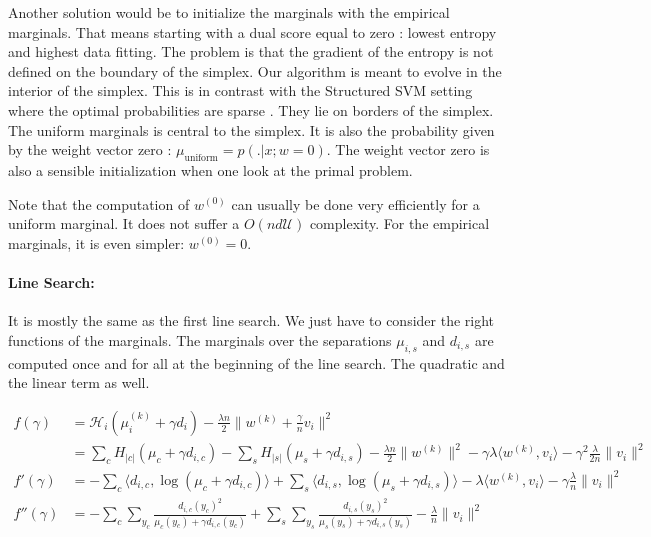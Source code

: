 \documentclass{article}
\DeclareMathOperator{\1}{\mathbb{1}}
\begin{document}
Another solution would be to initialize the marginals with the empirical marginals.
That means starting with a dual score equal to zero : lowest entropy and highest data fitting.
The problem is that the gradient of the entropy is not defined on the boundary of the simplex.
Our algorithm is meant to evolve in the interior of the simplex. 
This is in contrast with the Structured SVM setting where the optimal probabilities are sparse \cite{lacoste-julien_block-coordinate_2012}.
They lie on borders of the simplex.
The uniform marginals is central to the simplex.
It is also the probability given by the weight vector zero : $\mu_{\textrm{uniform}} = p(. |x ; w=0)$.
The weight vector zero is also a sensible initialization when one look at the primal problem.

Note that the computation of $w^{(0)}$ can usually be done very efficiently for a uniform marginal.
It does not suffer a $O(n d \mathcal U)$ complexity.
For the empirical marginals, it is even simpler: $w^{(0)}=0$.

\paragraph{Line Search:} 
It is mostly the same as the first line search.
We just have to consider the right functions of the marginals.
The marginals over the separations $\mu_{i, s}$ and $d_{i, s}$ are computed once and for all at the beginning of the line search.
The quadratic and the linear term as well.


\begin{align*}
	f(\gamma)
	& = \mathcal H_i(\mu_i^{(k)} + \gamma d_i) 
	- \frac{\lambda n}{2} \| w^{(k)} + \frac{\gamma}{n} v_i \|^2 
	\\
	& =  \sum_c H_{|c|}(\mu_c + \gamma d_{i, c}) 
	- \sum_s H_{|s|}(\mu_s + \gamma d_{i, s}) 
	- \frac{\lambda n}{2} \| w^{(k)}\|^2 
	- \gamma \lambda  \langle w^{(k)} , v_i \rangle 
	- \gamma^2 \frac{\lambda}{2n} \|v_i \|^2 
	\\
	f'(\gamma) & =  - \sum_c \langle d_{i, c}, \log(\mu_c + \gamma d_{i, c}) \rangle 
	+ \sum_s \langle d_{i, s} , \log(\mu_s + \gamma d_{i, s}) \rangle 
	- \lambda  \langle w^{(k)} , v_i \rangle 
	- \gamma \frac{\lambda}{n} \|v_i \|^2 
	\\
	f''(\gamma) & = - \sum_c \sum_{y_c} \frac{d_{i, c}(y_c)^2 }{ \mu_c(y_c) + \gamma d_{i, c}(y_c) }
	+ \sum_s \sum_{y_s} \frac{d_{i, s}(y_s)^2 }{ \mu_s(y_s) + \gamma d_{i, s}(y_s) }
	- \frac{\lambda}{n} \|v_i \|^2 
\end{align*}
\end{document}
